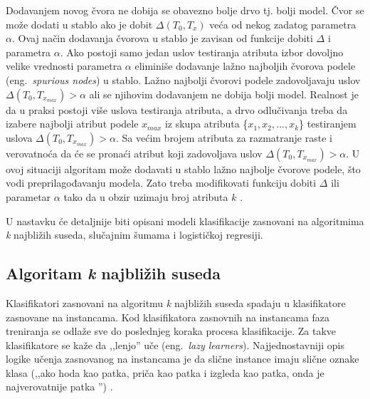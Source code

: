 \documentclass[12pt,oneside]{memoir}
\begin{document}
\begin{description}
Dodavanjem novog čvora ne dobija se obavezno bolje drvo tj. bolji model. Čvor se može dodati u stablo ako je dobit $\Delta(T_0, T_x)$ veća od nekog zadatog parametra $\alpha$. Ovaj način dodavanja čvorova u stablo je zavisan od funkcije dobiti $\Delta$ i parametra $\alpha$. Ako postoji samo jedan uslov testiranja atributa izbor dovoljno velike vrednosti parametra $\alpha$ eliminiše dodavanje lažno najboljih čvorova podele (eng.~\textit{spurious nodes}) u stablo. Lažno najbolji čvorovi podele zadovoljavaju uslov $\Delta(T_0, T_{x_{max}})>\alpha$ ali se njihovim dodavanjem ne dobija bolji model. Realnost je da u praksi postoji više uslova testiranja atributa, a drvo odlučivanja treba da izabere najbolji atribut podele $x_{max}$ iz skupa atributa \{$x_1, x_2,...,x_k$\} testiranjem uslova $\Delta(T_0, T_{x_{max}})>\alpha$. Sa većim brojem atributa za razmatranje raste i verovatnoća da će se pronaći atribut koji zadovoljava uslov $\Delta(T_0, T_{x_{max}})>\alpha$. U ovoj situaciji algoritam može dodavati u stablo lažno najbolje čvorove podele, što vodi preprilagođavanju modela. Zato treba modifikovati funkciju dobiti $\Delta$ ili parametar $\alpha$ tako da u obzir uzimaju broj atributa $k$ \cite{mitic}.
\end{description}

U nastavku će detaljnije biti opisani modeli klasifikacije zasnovani na algoritmima \textit{k} najbližih suseda, 
slučajnim šumama i logističkoj regresiji.

\subsection{Algoritam \textit{k} najbližih suseda}
\label{sec:knn}

Klasifikatori zasnovani na algoritmu \textit{k} najbližih suseda spadaju u klasifikatore zasnovane na instancama. Kod klasifikatora zasnovnih na instancama faza treniranja se odlaže sve do poslednjeg koraka procesa klasifikacije. Za takve klasifikatore se kaže da ,,lenjo'' uče (eng.~\textit{lazy learners}). Najjednostavniji opis logike učenja zasnovanog na instancama je da slične instance imaju slične oznake klasa (,,ako hoda kao patka, priča kao patka i izgleda kao patka, onda je najverovatnije patka \cite{mitic}'') \cite{aggarwal}.
\end{document}
